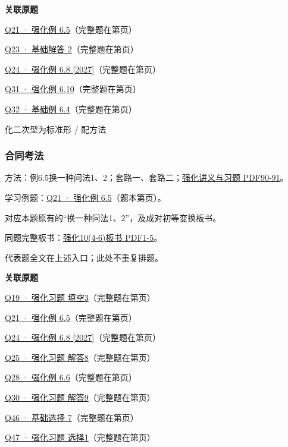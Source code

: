 \documentclass[UTF8,fontset=fandol,11pt,a4paper]{ctexart}
\newcommand{\source}[1]{{\footnotesize\color{Muted}#1\par}}
\begin{document}
\textbf{关联原题}\par
\hyperlink{R-EX-05}{Q21 · 强化例 6.5}（完整题在第\pageref*{R-EX-05}页）\par
\hyperlink{B-SA-02}{Q23 · 基础解答 2}（完整题在第\pageref*{B-SA-02}页）\par
\hyperlink{R-EX-08}{Q24 · 强化例 6.8 [2027]}（完整题在第\pageref*{R-EX-08}页）\par
\hyperlink{R-EX-10}{Q31 · 强化例 6.10}（完整题在第\pageref*{R-EX-10}页）\par
\hyperlink{B-EX-04}{Q32 · 基础例 6.4}（完整题在第\pageref*{B-EX-04}页）\par
\clearpage
\source{化二次型为标准形 / 配方法}
\subsubsection*{合同考法}
\hypertarget{node-A2C}{}
方法：例6.5换一种问法1、2；套路一、套路二；\href{file:///Users/skyintelligence/Desktop/\%E5\%BE\%97\%E8\%AF\%BB\%E4\%B8\%AA\%E7\%A0\%94-\%E5\%8C\%97\%E5\%A4\%A7\%E8\%BD\%AF\%E5\%BE\%AE/\%E6\%95\%B0\%E5\%AD\%A6\%20150/Kira\%C2\%B727\%E7\%BA\%BF\%E6\%80\%A7\%E4\%BB\%A3\%E6\%95\%B0\%E5\%BC\%BA\%E5\%8C\%96\%E8\%AE\%B2\%E4\%B9\%89\%2B\%E4\%B9\%A0\%E9\%A2\%98.pdf\#page=90}{强化讲义与习题 PDF90-91}。\par
学习例题：\hyperlink{R-EX-05}{Q21 · 强化例 6.5}（题本第\pageref*{R-EX-05}页）。\par
\source{对应本题原有的“换一种问法1、2”，及成对初等变换板书。}
同题完整板书：\href{file:///Users/skyintelligence/Desktop/\%E5\%BE\%97\%E8\%AF\%BB\%E4\%B8\%AA\%E7\%A0\%94-\%E5\%8C\%97\%E5\%A4\%A7\%E8\%BD\%AF\%E5\%BE\%AE/\%E6\%95\%B0\%E5\%AD\%A6\%20150/\%E7\%BA\%BF\%E6\%80\%A7\%E4\%BB\%A3\%E6\%95\%B0/\%E7\%BA\%BF\%E4\%BB\%A3\%E5\%BC\%BA\%E5\%8C\%9610\%284-6\%29\%20\%20\%E7\%AC\%AC\%E5\%85\%AD\%E7\%AB\%A0\%20\%E4\%BA\%8C\%E6\%AC\%A1\%E5\%9E\%8B2\%E3\%80\%90\%E4\%BE\%8B6.5\%E3\%80\%91-\%E3\%80\%90\%E4\%BE\%8B6.13\%E3\%80\%91.pdf\#page=1}{强化10(4-6)板书 PDF1-5}。\par
\vspace{3mm}
\source{代表题全文在上述入口；此处不重复排题。}
\textbf{关联原题}\par
\hyperlink{R-FILL-03}{Q19 · 强化习题 填空3}（完整题在第\pageref*{R-FILL-03}页）\par
\hyperlink{R-EX-05}{Q21 · 强化例 6.5}（完整题在第\pageref*{R-EX-05}页）\par
\hyperlink{R-EX-08}{Q24 · 强化例 6.8 [2027]}（完整题在第\pageref*{R-EX-08}页）\par
\hyperlink{R-LONG-08}{Q25 · 强化习题 解答8}（完整题在第\pageref*{R-LONG-08}页）\par
\hyperlink{R-EX-06}{Q28 · 强化例 6.6}（完整题在第\pageref*{R-EX-06}页）\par
\hyperlink{R-LONG-09}{Q30 · 强化习题 解答9}（完整题在第\pageref*{R-LONG-09}页）\par
\hyperlink{B-MC-07}{Q46 · 基础选择 7}（完整题在第\pageref*{B-MC-07}页）\par
\hyperlink{R-MC-01}{Q47 · 强化习题 选择1}（完整题在第\pageref*{R-MC-01}页）\par
\clearpage
\end{document}
